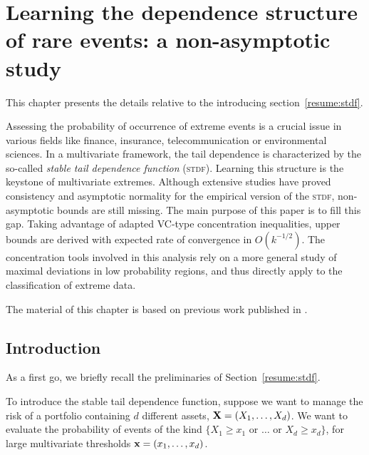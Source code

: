 \chapter{Learning the dependence structure of rare events:
a non-asymptotic study}
\label{colt}

\begin{chapabstract}
This chapter presents the details relative to the introducing section~\ref{resume:stdf}.

Assessing the probability of occurrence of extreme events is a crucial issue in various fields like finance, insurance, telecommunication or environmental sciences. In a multivariate framework, the tail dependence is characterized by the so-called \emph{stable tail dependence function} (\textsc{stdf}). Learning this structure is the keystone of multivariate extremes. Although extensive studies have proved consistency and asymptotic normality for the empirical version of the \textsc{stdf}, non-asymptotic bounds are still missing. The main purpose of this paper is to fill this gap. Taking advantage of adapted VC-type concentration inequalities, upper bounds are derived with expected rate of convergence in $O(k^{-1/2})$. The concentration tools involved in this analysis rely on a more general study of maximal deviations in low probability regions, and thus directly apply to the classification of extreme data.

The material of this chapter is based on previous work published in \cite{COLT15}.
\end{chapabstract}


\section{Introduction}
\label{colt:sec:intro}

As a first go, we briefly recall the preliminaries of Section~\ref{resume:stdf}.

To introduce the stable tail dependence function,  suppose we want to manage the risk of a
  portfolio  containing $d$ different assets,  $\mathbf
X = (X_1,\ldots,X_d)$.
We want to evaluate  the
probability of events of the kind 
$\{X_1 \ge x_1 \text{ or }  \dotsc \text{ or }
X_d\ge x_d \}$, for large multivariate thresholds $\mathbf
x=(x_1,\ldots,x_d)$.  
 
